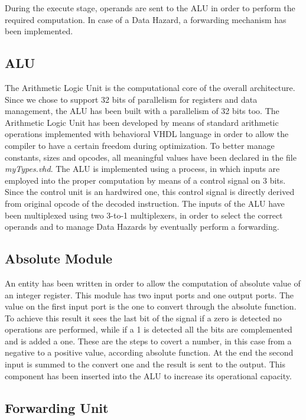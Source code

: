 During the execute stage, operands are sent to the ALU in order to perform the required computation. 
In case of a Data Hazard, a forwarding mechanism has been implemented.

\subsection{ALU}

The Arithmetic Logic Unit is the computational core of the overall architecture.
Since we chose to support 32 bits of parallelism for registers and data management, the ALU has been built with a parallelism of 32 bits too.
The Arithmetic Logic Unit has been developed by means of standard arithmetic operations implemented with behavioral VHDL language in order to allow the compiler 
to have a certain freedom during optimization.
To better manage constants, sizes and opcodes, all meaningful values have been declared in the file \textit{myTypes.vhd}.
The ALU is implemented using a process, in which inputs are employed into the proper computation by means of a control signal on 3 bits.
Since the control unit is an hardwired one, this control signal is directly derived from original opcode of the decoded instruction.
The inputs of the ALU have been multiplexed using two 3-to-1 multiplexers, in order to select the correct operands and to
manage Data Hazards by eventually perform a forwarding.
    

\subsection{Absolute Module}

An entity has been written in order to allow the computation of absolute value of an integer register.
This module has two input ports and one output ports. The value on the first input port is the one to convert 
through the absolute function. To achieve this result it sees the last bit of the signal if a zero is detected 
no operations are performed, while if a 1 is detected all the bits are complemented and is added a one. 
These are the steps to covert a number, in this case from a negative to a positive value, according absolute function.
At the end the second input is summed to the convert one and the result is sent to the output.
This component has been inserted into the ALU to increase its operational capacity.

\subsection{Forwarding Unit}

